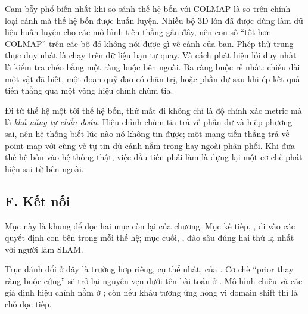 \documentclass[../../../deep_learning.tex]{subfiles}
\begin{document}
\begin{cambay}
Cạm bẫy phổ biến nhất khi so sánh thế hệ bốn với COLMAP là so trên chính loại cảnh mà thế hệ bốn được huấn luyện. Nhiều bộ  3D lớn đã được dùng làm dữ liệu huấn luyện cho các mô hình tiến thẳng gần đây, nên con số ``tốt hơn COLMAP'' trên các bộ đó không nói được gì về cảnh của bạn. Phép thử trung thực duy nhất là chạy trên dữ liệu bạn tự quay. Và cách phát hiện lỗi duy nhất là kiểm tra chéo bằng một ràng buộc bên ngoài. Ba ràng buộc rẻ nhất: chiều dài một vật đã biết, một đoạn quỹ đạo có chân trị, hoặc phần dư sau khi ép kết quả tiến thẳng qua một vòng hiệu chỉnh chùm tia.
\end{cambay}

\begin{cannho}
Đi từ thế hệ một tới thế hệ bốn, thứ mất đi không chỉ là độ chính xác metric mà là \emph{khả năng tự chẩn đoán}. Hiệu chỉnh chùm tia trả về phần dư và hiệp phương sai, nên hệ thống biết lúc nào nó không tin được; một mạng tiến thẳng trả về point map với cùng vẻ tự tin dù cảnh nằm trong hay ngoài phân phối. Khi đưa thế hệ bốn vào hệ thống thật, việc đầu tiên phải làm là dựng lại một cơ chế phát hiện sai từ bên ngoài. 
\end{cannho}

\subsection{F. Kết nối}
Mục này là khung để đọc hai mục còn lại của chương. Mục kế tiếp,
, đi vào các quyết định con bên trong mỗi thế hệ; mục cuối,
, đào sâu đúng hai thứ lạ nhất với người làm SLAM.

Trục đánh đổi ở đây là trường hợp riêng, cụ thể nhất, của . Cơ chế ``prior thay ràng buộc cứng'' sẽ trở lại nguyên vẹn dưới tên bài toán  ở
. Mô hình chiếu và các giả định hiệu chỉnh nằm ở
; còn nếu khâu tương ứng hỏng vì domain shift thì  là chỗ đọc tiếp.
\end{document}
